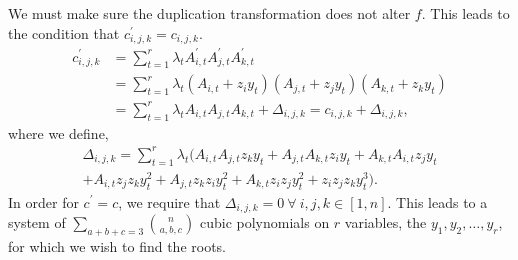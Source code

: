 \documentclass[11pt,a4paper]{article}
\begin{document}
	We must make sure the duplication transformation does not alter $f$. This leads to the condition that $c^\prime_{i,j,k} = c_{i,j,k}$.
	\begin{align}
	c^\prime_{i,j,k} &= \sum_{t=1}^r \lambda_t A^\prime_{i,t} A^\prime_{j,t} A^\prime_{k,t} \\
	&=  \sum_{t=1}^r \lambda_t (A_{i,t} + z_iy_t) (A_{j,t} + z_jy_t) (A_{k,t} + z_ky_t) \\
	&= \sum_{t=1}^{r} \lambda_t A_{i,t} A_{j,t} A_{k,t} + \Delta_{i,j,k} = c_{i,j,k} + \Delta_{i,j,k},
	\end{align} where we define,	
	\begin{multline}
	\label{eq_delta_1}
	\Delta_{i,j,k} = \sum_{t=1}^r \lambda_t (A_{i,t} A_{j,t} z_k y_t + A_{j,t} A_{k,t} z_i y_t + A_{k,t} A_{i,t} z_j y_t \\
	 + A_{i,t}z_j z_k y_t^2 + A_{j,t}z_k z_i y_t^2 + A_{k,t}z_i z_j y_t^2
	 + z_iz_jz_ky_t^3).
	\end{multline}
	In order for $c^\prime = c$, we require that $\Delta_{i,j,k}=0 \ \forall \ i,j,k \in [1,n]$. This leads to a system of $\sum_{a+b+c=3}\binom{n}{a, b, c}$ cubic polynomials on $r$ variables, the $y_1, y_2, \dots, y_r$, for which we wish to find the roots. 
	\\
	
\end{document}
